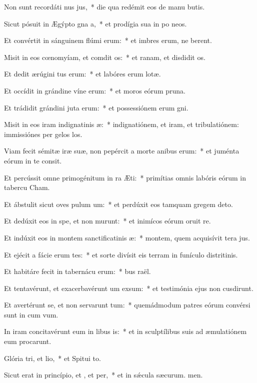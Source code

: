 \item Non sunt recordáti nus jus,~* die qua redémit eos de manu butis.
\item Sicut pósuit in Ægýpto gna a,~* et prodígia sua in po neos.
\item Et convértit in sánguinem flúmi erum:~* et imbres erum, ne berent.
\item Misit in eos cœnomyíam, et comdit os:~* et ranam, et disdidit os.
\item Et dedit ærúgini tus erum:~* et labóres erum lotæ.
\item Et occídit in grándine víne erum:~* et moros eórum  pruna.
\item Et trádidit grándini juta erum:~* et possessiónem erum gni.
\item Misit in eos iram indignatinis æ:~* indignatiónem, et iram, et tribulatiónem: immissiónes per gelos los.
\item Viam fecit sémitæ iræ suæ, non pepércit a morte anibus erum:~* et juménta eórum in te consit.
\item Et percússit omne primogénitum in ra Æti:~* primítias omnis labóris eórum in tabercu Cham.
\item Et ábstulit sicut oves pulum um:~* et perdúxit eos tamquam gregem  deto.
\item Et dedúxit eos in spe, et non murunt:~* et inimícos eórum oruit re.
\item Et indúxit eos in montem sanctificatinis æ:~* montem, quem acquisívit tera jus.
\item Et ejécit a fácie erum tes:~* et sorte divísit eis terram in funículo distritinis.
\item Et habitáre fecit in tabernácu erum:~* bus raël.
\item Et tentavérunt, et exacerbavérunt um exsum:~* et testimónia ejus non cusdirunt.
\item Et avertérunt se, et non servarunt tum:~* quemádmodum patres eórum convérsi sunt in cum vum.
\item In iram concitavérunt eum in libus is:~* et in sculptílibus suis ad æmulatiónem eum procarunt.
\item Glória tri, et lio,~* et Spitui to.
\item Sicut erat in princípio, et , et per,~* et in sǽcula sæcurum. men.
